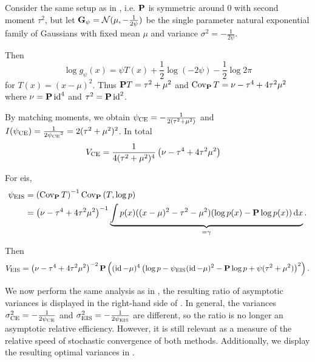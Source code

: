 \begin{example}
    \label{ex:univ-gaussian-mu-fixed}
    Consider the same setup as in , i.e. $\P$ is symmetric around $0$ with second moment $\tau^{2}$, but let $\G_{\psi} = \mathcal N(\mu, -\frac{1}{2\psi})$ be the single parameter natural exponential family of Gaussians with fixed mean $\mu$ and variance $\sigma^{2} = -\frac{1}{2 \psi}$. 
    
    Then
    $$
    \log g_{\psi}(x) = \psi T(x) + \frac{1}{2}\log \left( - 2 \psi \right) - \frac{1}{2} \log 2\pi
    $$
    for $T(x) = (x - \mu)^{2}$. Thus $\P T = \tau^{2} + \mu^{2}$ and $\cov_{\P} T = \nu - \tau^{4} + 4\tau^{2}\mu^{2}$ where $\nu = \P \operatorname{id}^{4}$ and $\tau^{2} = \P \id^{2}$. 

    By matching moments, we obtain $\pce = -\frac{1}{2(\tau^{2} + \mu^{2})}$ and $I(\pce) = \frac{1}{2\pce^{2}} = 2(\tau^{2} + \mu^{2})^{2}$. In total 
    \begin{align}
        V_{\ce} &= \frac{1}{4 (\tau^{2} + \mu^{2})^{4}} \left( \nu - \tau^{4} + 4\tau^{2}\mu^{2} \right)
    \end{align}

    For \gls{eis},
    \begin{align*}
    \peis &= \left( \cov_{\P} T \right)^{-1} \cov_{\P} \left( T, \log p \right) \\
        &= \left( \nu - \tau^{4} + 4\tau^{2}\mu^{2} \right)^{-1} \underbrace{\int p(x)((x-\mu)^{2}-\tau^{2} - \mu^{2})(\log p(x) - \P\log p(x)) \d x}_{=\gamma}.
    \end{align*}
    
    Then 
    \begin{align*}
        V_{\eis} = \left( \nu - \tau^{4} + 4 \tau^{2}\mu^{2}\right)^{-2} \P \left( (\id - \mu)^{4} \left( \log p - \peis (\id - \mu)^{2} - \P \log p + \psi (\tau^{2} + \mu^{2}) \right)^{2} \right).
    \end{align*}

    We now perform the same analysis as in , the resulting ratio of asymptotic variances is displayed in the right-hand side of . In general, the variances $\sigma^{2}_{\ce} = -\frac{1}{2\pce}$ and $\sigma^{2}_{\eis} = -\frac{1}{2\peis}$ are different, so the ratio is no longer an asymptotic relative efficiency. However, it is still relevant as a measure of the relative speed of stochastic convergence of both methods. Additionally, we display the resulting optimal variances in .


\end{example}
